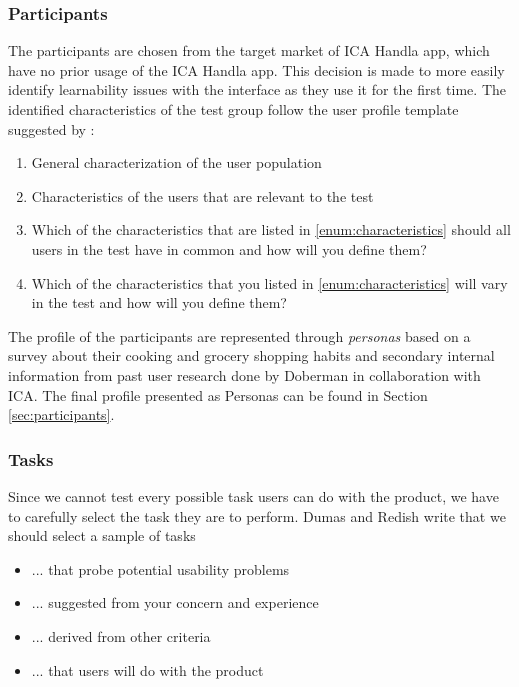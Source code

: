 \subsubsection{Participants}
\label{subsubsec:participants}
The participants are chosen from the target market of ICA Handla app, which have no prior usage of the ICA Handla app. This decision is made to more easily identify learnability issues with the interface as they use it for the first time. The identified characteristics of the test group follow the user profile template suggested by \cite{Dumas1999}:

\begin{enumerate}
  \item General characterization of the user population
  \item \label{enum:characteristics}Characteristics of the users that are relevant to the test
  \item Which of the characteristics that are listed in \ref{enum:characteristics} should all users in the test have in common and how will you define them?
  \item Which of the characteristics that you listed in \ref{enum:characteristics} will vary in the test and how will you define them?
\end{enumerate}

The profile of the participants are represented through \textit{personas} based on a survey about their cooking and grocery shopping habits and secondary internal information from past user research done by Doberman in collaboration with ICA. The final profile presented as Personas can be found in Section \ref{sec:participants}.

\subsubsection{Tasks}
\label{subsubsec:tasks}

Since we cannot test every possible task users can do with the product, we have to carefully select the task they are to perform. Dumas and Redish \cite{Dumas1999} write that we should select a sample of tasks
\begin{itemize}[noitemsep]
  \item ... that probe potential usability problems
  \item ... suggested from your concern and experience
  \item ... derived from other criteria
  \item ... that users will do with the product
\end{itemize}

